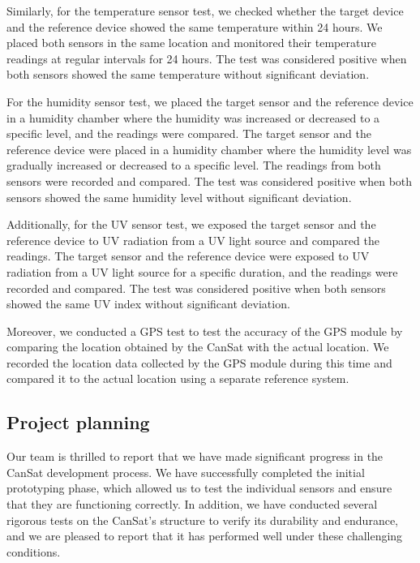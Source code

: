 \documentclass[11pt]{article}
\begin{document}
Similarly, for the temperature sensor test, we checked whether the target device and the reference device showed the same temperature within 24 hours. We placed both sensors in the same location and monitored their temperature readings at regular intervals for 24 hours. The test was considered positive when both sensors showed the same temperature without significant deviation.

For the humidity sensor test, we placed the target sensor and the reference device in a humidity chamber where the humidity was increased or decreased to a specific level, and the readings were compared. The target sensor and the reference device were placed in a humidity chamber where the humidity level was gradually increased or decreased to a specific level. The readings from both sensors were recorded and compared. The test was considered positive when both sensors showed the same humidity level without significant deviation.

Additionally, for the UV sensor test, we exposed the target sensor and the reference device to UV radiation from a UV light source and compared the readings. The target sensor and the reference device were exposed to UV radiation from a UV light source for a specific duration, and the readings were recorded and compared. The test was considered positive when both sensors showed the same UV index without significant deviation.

Moreover, we conducted a GPS test to test the accuracy of the GPS module by comparing the location obtained by the CanSat with the actual location. We recorded the location data collected by the GPS module during this time and compared it to the actual location using a separate reference system.


\subsection*{Project planning}

Our team is thrilled to report that we have made significant progress in the CanSat development process. We have successfully completed the initial prototyping phase, which allowed us to test the individual sensors and ensure that they are functioning correctly. In addition, we have conducted several rigorous tests on the CanSat's structure to verify its durability and endurance, and we are pleased to report that it has performed well under these challenging conditions.
\end{document}
